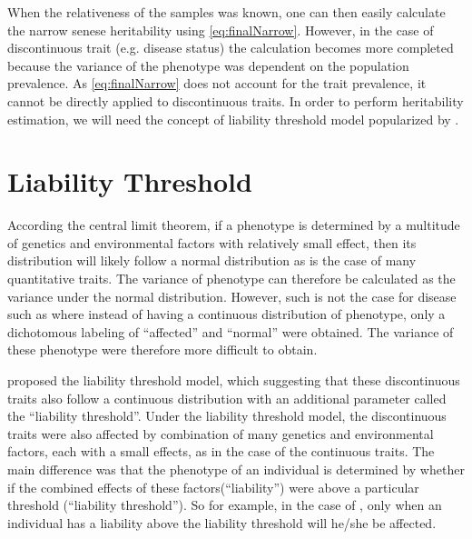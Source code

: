 \documentclass{book}
\newcommand*{\glng}{\glsentrylong}
\begin{document}
	When the relativeness of the samples was known, one can then easily calculate the narrow senese heritability using \cref{eq:finalNarrow}.
	However, in the case of discontinuous trait (e.g. disease status) the calculation becomes more completed because the variance of the phenotype was dependent on the population prevalence.
	As \cref{eq:finalNarrow} does not account for the trait prevalence, it cannot be directly applied to discontinuous traits.
	In order to perform heritability estimation, we will need the concept of liability threshold model popularized by \cite{Falconer1965}.
	
	\section{Liability Threshold}
	According the central limit theorem, if a phenotype is determined by a multitude of genetics and environmental factors with relatively small effect, then its distribution will likely follow a normal distribution as is the case of many quantitative traits\citep{Visscher2008}. %
	The variance of phenotype can therefore be calculated as the variance under the normal distribution.
	However, such is not the case for disease such as \glng{scz} where instead of having a continuous distribution of phenotype, only a dichotomous labeling of ``affected'' and ``normal'' were obtained.
	The variance of these phenotype were therefore more difficult to obtain.
	
	\citet{Falconer1965} proposed the liability threshold model, which suggesting that these discontinuous traits also follow a continuous distribution with an additional parameter called the ``liability threshold''.
	Under the liability threshold model, the discontinuous traits were also affected by combination of many genetics and environmental factors, each with a small effects, as in the case of the continuous traits.
	The main difference was that the phenotype of an individual is determined by whether if the combined effects of these factors(``liability'') were above a particular threshold (``liability threshold'').
	So for example, in the case of \glng{scz}, only when an individual has a liability above the liability threshold will he/she be affected.
	
	
\end{document}
